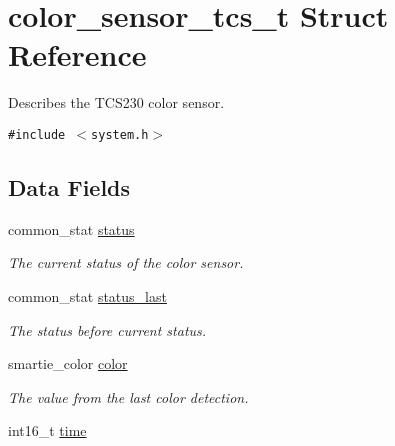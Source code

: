 \hypertarget{structcolor__sensor__tcs__t}{
\section{color\_\-sensor\_\-tcs\_\-t Struct Reference}
\label{structcolor__sensor__tcs__t}
}
Describes the TCS230 color sensor.  


{\tt \#include $<$system.h$>$}

\subsection*{Data Fields}
\begin{CompactItemize}
\item 
\hypertarget{structcolor__sensor__tcs__t_6cf7d985b536f4551302359ddb90c802}{
common\_\-stat \hyperlink{structcolor__sensor__tcs__t_6cf7d985b536f4551302359ddb90c802}{status}}
\label{structcolor__sensor__tcs__t_6cf7d985b536f4551302359ddb90c802}

\begin{CompactList}\small\item\em The current status of the color sensor. \item\end{CompactList}\item 
\hypertarget{structcolor__sensor__tcs__t_a7f30fead1929b6ef4c7923fff04ec46}{
common\_\-stat \hyperlink{structcolor__sensor__tcs__t_a7f30fead1929b6ef4c7923fff04ec46}{status\_\-last}}
\label{structcolor__sensor__tcs__t_a7f30fead1929b6ef4c7923fff04ec46}

\begin{CompactList}\small\item\em The status before current status. \item\end{CompactList}\item 
\hypertarget{structcolor__sensor__tcs__t_645722a2409effbe46339525eba50542}{
smartie\_\-color \hyperlink{structcolor__sensor__tcs__t_645722a2409effbe46339525eba50542}{color}}
\label{structcolor__sensor__tcs__t_645722a2409effbe46339525eba50542}

\begin{CompactList}\small\item\em The value from the last color detection. \item\end{CompactList}\item 
\hypertarget{structcolor__sensor__tcs__t_e9113cc53cd30cde0c6a1cdbdef7898d}{
int16\_\-t \hyperlink{structcolor__sensor__tcs__t_e9113cc53cd30cde0c6a1cdbdef7898d}{time}}
\label{structcolor__sensor__tcs__t_e9113cc53cd30cde0c6a1cdbdef7898d}


\end{CompactItemize}
